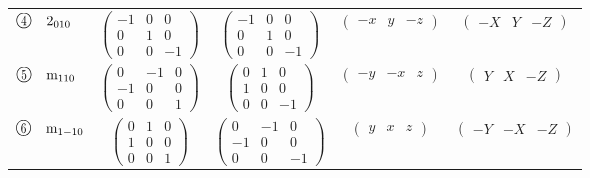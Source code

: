 \documentclass[fleqn,10pt,landscape]{jsarticle}
\begin{document}
\begin{center}
\begin{longtable}{lcccc}
$ {\ooalign{\hfil\resizebox{.8\width}{\height}{4}\hfil\crcr\raise.1ex\hbox{\large$\bigcirc$}}}\quad 2{}_{010} $ & $ \begin{pmatrix} -1 & 0 & 0 \\ 0 & 1 & 0 \\ 0 & 0 & -1 \end{pmatrix} $ & $ \begin{pmatrix} -1 & 0 & 0 \\ 0 & 1 & 0 \\ 0 & 0 & -1 \end{pmatrix} $ & $ \begin{pmatrix} - x & y & - z \end{pmatrix} $ & $ \begin{pmatrix} - X & Y & - Z \end{pmatrix} $ \\
$ {\ooalign{\hfil\resizebox{.8\width}{\height}{5}\hfil\crcr\raise.1ex\hbox{\large$\bigcirc$}}}\quad {\rm m}_{110} $ & $ \begin{pmatrix} 0 & -1 & 0 \\ -1 & 0 & 0 \\ 0 & 0 & 1 \end{pmatrix} $ & $ \begin{pmatrix} 0 & 1 & 0 \\ 1 & 0 & 0 \\ 0 & 0 & -1 \end{pmatrix} $ & $ \begin{pmatrix} - y & - x & z \end{pmatrix} $ & $ \begin{pmatrix} Y & X & - Z \end{pmatrix} $ \\
$ {\ooalign{\hfil\resizebox{.8\width}{\height}{6}\hfil\crcr\raise.1ex\hbox{\large$\bigcirc$}}}\quad {\rm m}_{1-10} $ & $ \begin{pmatrix} 0 & 1 & 0 \\ 1 & 0 & 0 \\ 0 & 0 & 1 \end{pmatrix} $ & $ \begin{pmatrix} 0 & -1 & 0 \\ -1 & 0 & 0 \\ 0 & 0 & -1 \end{pmatrix} $ & $ \begin{pmatrix} y & x & z \end{pmatrix} $ & $ \begin{pmatrix} - Y & - X & - Z \end{pmatrix} $ \\

\end{longtable}
\end{center}
\end{document}
